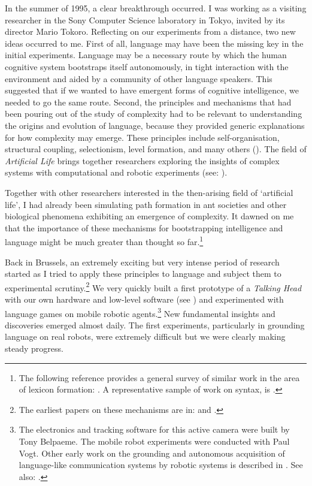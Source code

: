 In the summer of 1995, a clear breakthrough occurred.  
I was working as a visiting researcher in the Sony
Computer Science laboratory in Tokyo, invited by its director
Mario Tokoro. Reflecting on our 
experiments from a distance, two new ideas occurred to me. 
First of all, language may have been the missing key
in the initial experiments. Language may 
be a necessary route by which the human cognitive system
bootstraps itself autonomously, in tight interaction with the
environment and aided by a community of other
language speakers. This suggested that if we wanted
to have emergent
forms of cognitive intelligence, we needed to go the same 
route. Second, the principles and mechanisms that had been
pouring out of the study of complexity had to be
relevant to understanding the origins and evolution of language,
because they provided generic explanations for how complexity 
may emerge. These principles include 
self-organisation, structural coupling, 
selectionism, level formation, 
and many others (\cite{Nicolis:1989}). The field of {\it Artificial Life} brings together researchers
exploring the insights of complex systems with computational
and robotic experiments (see: \cite{Langton:1995}).

Together with 
other researchers interested in the then-arising field of `artificial life', I had 
already been simulating path formation in 
ant societies and other biological phenomena exhibiting 
an emergence of complexity. It dawned on me that the
importance of these mechanisms for bootstrapping intelligence and
language might be much greater than 
thought so far.\footnote{The following reference provides a general survey of similar work in 
the area of lexicon formation: \cite{Steels:97b}. 
A representative sample of work on syntax, is \cite{Briscoe:1999}.}

Back in Brussels, an extremely exciting but very 
intense period of research started as I tried to 
apply these principles to language
and subject them to experimental 
scrutiny.\footnote{The earliest papers on these mechanisms are in: \cite{Steels:95b} and 
\cite{Steels:96a}.}
We very quickly built a first 
prototype of a {\it Talking Head} with our own hardware
and low-level software (see ) 
and experimented with language games on mobile 
robotic agents.\footnote{The electronics and tracking software for this 
active camera were built by Tony Belpaeme. The mobile
robot experiments were conducted with Paul Vogt. 
Other early work on the grounding and autonomous acquisition of 
language-like communication systems by robotic systems is 
described in \cite{Steels:97g}. See also: \cite{Billard:1998}.}
New fundamental insights and discoveries emerged almost daily. 
The first experiments, particularly in grounding
language on real robots, were extremely difficult but we 
were clearly making steady progress. 


